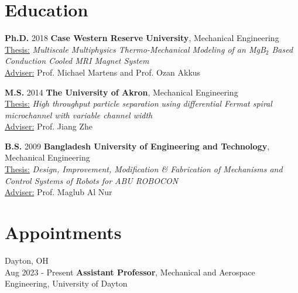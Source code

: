\documentclass[11pt, letterpaper]{article}
\begin{document}
\section{Education}
   
    \begin{threecolentry}[33 pt, \fill, 40 pt]
        {\textbf{Ph.D.}}
        {2018}
        \textbf{Case Western Reserve University}, Mechanical Engineering \\
        \uline{Thesis:} \textit{Multiscale Multiphysics Thermo-Mechanical
Modeling of an MgB$_2$ Based Conduction Cooled MRI
Magnet System}\\
        \uline{Adviser:} Prof. Michael Martens and Prof. Ozan Akkus
    \end{threecolentry}

    \begin{threecolentry}[33 pt, \fill, 40 pt]
        {\textbf{M.S.}}
        {2014}
        \textbf{The University of Akron}, Mechanical Engineering \\
        \uline{Thesis:} \textit{High throughput particle separation using
differential Fermat spiral microchannel with variable
channel width}\\
        \uline{Adviser:} Prof. Jiang Zhe
    \end{threecolentry}

    \begin{threecolentry}[33 pt, \fill, 40 pt]
        {\textbf{B.S.}}
        {2009}
        \textbf{Bangladesh University of Engineering and Technology}, Mechanical Engineering \\
        \uline{Thesis:} \textit{Design, Improvement, Modification \& Fabrication
of Mechanisms and Control Systems of Robots for ABU
ROBOCON}\\
        \uline{Adviser:} Prof. Maglub Al Nur
    \end{threecolentry}

\section{Appointments}
    
    \begin{twocolentry}{
        Dayton, OH\\
        Aug 2023 - Present
    }
        \textbf{Assistant Professor}, Mechanical and Aerospace Engineering, University of Dayton
    \end{twocolentry}
    \vspace{5 pt}
\end{document}
